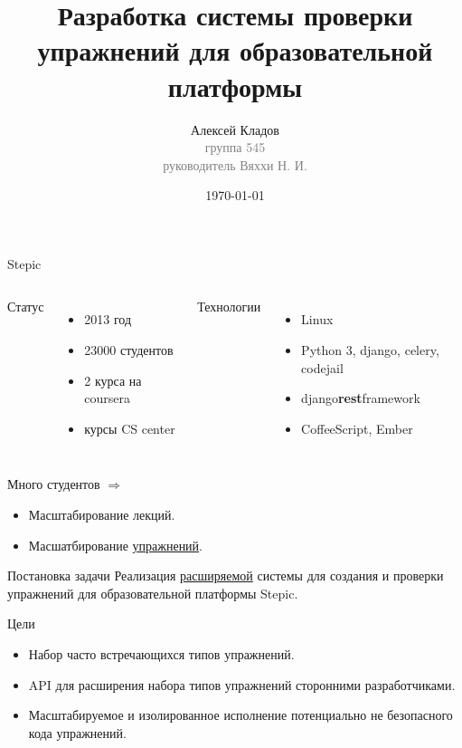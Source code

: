 \documentclass{beamer}
\title[Упражнения в Stepic]{Разработка системы проверки упражнений для
  образовательной платформы}
\author{Алексей Кладов\\
  { \footnotesize \textcolor{gray}{группа 545\\ руководитель Вяххи Н. И.}}}
\institute[СПбГУ]{Санк-Петербургский Государственный Университет}
\date{\today} %
\begin{document}
\begin{frame}
\titlepage %
\end{frame}

\begin{frame}{Stepic}
  \begin{columns}[t]
    Статус
    \begin{itemize}
    \item 2013 год
    \item 23000 студентов
    \item 2 курса на coursera
    \item курсы CS center
    \end{itemize}

    Технологии
    \begin{itemize}
    \item Linux
    \item Python 3, django, celery, codejail
    \item django\textbf{rest}framework
    \item CoffeeScript, Ember
    \end{itemize}
  \end{columns}

  \medskip

  Много студентов $\Rightarrow$
  \begin{itemize}
  \item Масштабирование лекций.
  \item Масшатбирование \underline{упражнений}.
  \end{itemize}
\end{frame}

\begin{frame}{Постановка задачи}
  Реализация \underline{расширяемой} системы для создания и проверки упражнений
  для образовательной платформы Stepic.

  \medskip

  Цели
  \begin{itemize}
  \item Набор часто встречающихся типов упражнений.
  \item API для расширения набора типов упражнений
    сторонними разработчиками.
  \item Масштабируемое и изолированное исполнение потенциально не
    безопасного кода упражнений.
  \end{itemize}
\end{frame}
\end{document}
